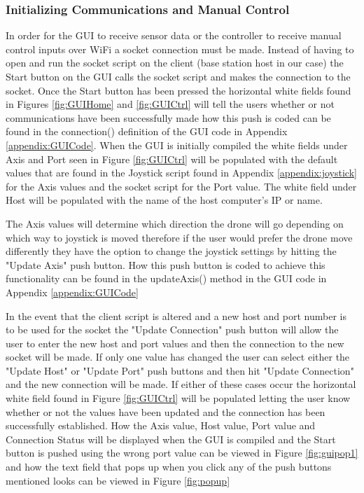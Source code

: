 \subsubsection{Initializing Communications and Manual Control}
In order for the GUI to receive sensor data or the controller to receive manual control inputs over WiFi a socket connection must be made. Instead of having to open and run the socket script on the client (base station host in our case) the Start button on the GUI calls the socket script and makes the connection to the socket. Once the Start button has been pressed the horizontal white fields found in Figures \ref{fig:GUIHome} and \ref{fig:GUICtrl} will tell the users whether or not communications have been successfully made how this push is coded can be found in the connection() definition of the GUI code in Appendix \ref{appendix:GUICode}. When the GUI is initially compiled the white fields under Axis and Port seen in Figure \ref{fig:GUICtrl} will be populated with the default values that are found in the Joystick script found in Appendix \ref{appendix:joystick} for the Axis values and the socket script for the Port value. The white field under Host will be populated with the name of the host computer's IP or name. 

The Axis values will determine which direction the drone will go depending on which way to joystick is moved therefore if the user would prefer the drone move differently they have the option to change the joystick settings by hitting the "Update Axis" push button. How this push button is coded to achieve this functionality can be found in the updateAxis() method in the GUI code in Appendix \ref{appendix:GUICode}

In the event that the client script is altered and a new host and port number is to be used for the socket the "Update Connection" push button will allow the user to enter the new host and port values and then the connection to the new socket will be made. If only one value has changed the user can select either the "Update Host" or "Update Port" push buttons and then hit "Update Connection" and the new connection will be made. If either of these cases occur the horizontal white field found in Figure \ref{fig:GUICtrl} will be populated letting the user know whether or not the values have been updated and the connection has been successfully established. How the Axis value, Host value, Port value and Connection Status will be displayed when the GUI is compiled and the Start button is pushed using the wrong port value can be viewed in Figure \ref{fig:guipop1} and how the text field that pops up when you click any of the push buttons mentioned looks can be viewed in Figure \ref{fig:popup}

